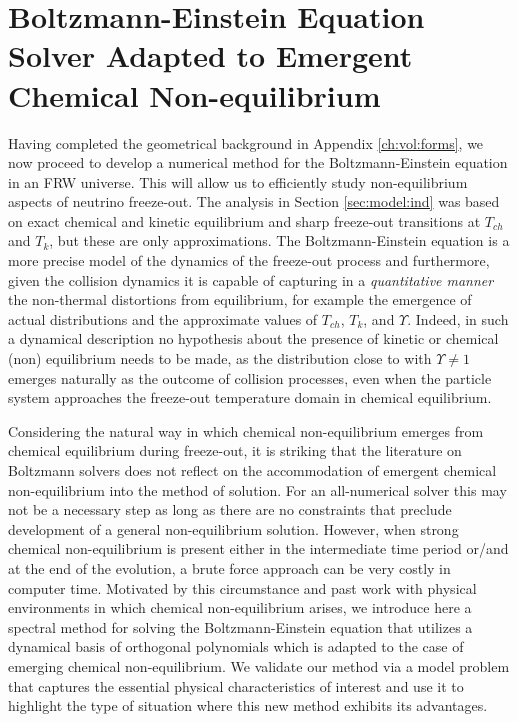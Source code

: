 \section{Boltzmann-Einstein Equation Solver Adapted to Emergent Chemical Non-equilibrium}\label{ch:boltz:orthopoly}

Having completed the geometrical background in Appendix \ref{ch:vol:forms}, we now proceed to develop a numerical method for the Boltzmann-Einstein equation in an FRW universe.  This will allow us to efficiently study  non-equilibrium aspects of neutrino freeze-out. The analysis in Section \ref{sec:model:ind} was based on exact chemical and kinetic equilibrium and sharp freeze-out transitions at $T_{ch}$ and $T_k$, but these are  only approximations.  The  Boltzmann-Einstein equation is a more precise model of the dynamics of the freeze-out process and furthermore, given the collision dynamics it is capable of capturing in a {\em quantitative manner} the non-thermal distortions from equilibrium, for example the emergence of actual distributions and the approximate values  of $T_{ch}$, $T_k$, and $\Upsilon$.  Indeed,  in  such a dynamical description no hypothesis about the presence of kinetic or chemical (non) equilibrium needs to be made, as the distribution close to  with   $\Upsilon\ne  1$ emerges naturally as the outcome of collision processes, even when the particle system approaches the freeze-out temperature domain  in chemical equilibrium.

Considering the natural way in which chemical non-equilibrium emerges from chemical equilibrium during freeze-out, it is striking that the literature on Boltzmann solvers does not reflect on the accommodation of emergent chemical non-equilibrium into the method of solution. For an all-numerical solver this may not be a necessary step as long as there are no constraints that preclude development of a general non-equilibrium solution. However, when strong chemical non-equilibrium is present either in the intermediate time period or/and at the end of the evolution, a brute force approach can be very costly in computer time. Motivated by this circumstance and past work with physical environments in which chemical non-equilibrium arises,  we introduce here a  spectral method for solving the Boltzmann-Einstein equation that utilizes a dynamical basis of orthogonal polynomials which is adapted to the case of emerging chemical non-equilibrium. We validate our method via a  model problem  that captures the essential physical characteristics of interest and use it to highlight the type of situation where this new method exhibits its advantages.

